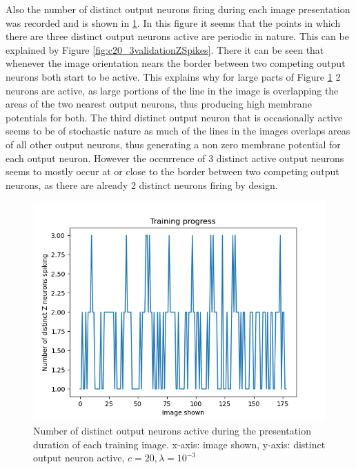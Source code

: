 Also the number of distinct output neurons firing during each image presentation was recorded and is shown in \ref{fig:c20_3validationDistinctZSpikes}. In this figure it seems that the points in which there are three distinct output neurons active are periodic in nature. This can be explained by Figure \ref{fig:c20_3validationZSpikes}. There it can be seen that whenever the image orientation nears the border between two competing output neurons both start to be active. This explains why for large parts of Figure \ref{fig:c20_3validationDistinctZSpikes} 2 neurons are active, as large portions of the line in the image is overlapping the areas of the two nearest output neurons, thus producing high membrane potentials for both. The third distinct output neuron that is occasionally active seems to be of stochastic nature as much of the lines in the images overlaps areas of all other output neurons, thus generating a non zero membrane potential for each output neuron. However the occurrence of 3 distinct active output neurons seems to mostly occur at or close to the border between two competing output neurons, as there are already 2 distinct neurons firing by design.

\begin{figure}
  \includegraphics[width=\linewidth]{figures/angleNetwork/c20_3validationDistinctZSpikes.png}
  \caption{Number of distinct output neurons active during the presentation duration of each training image. x-axis: image shown, y-axis: distinct output neuron active, $c = 20, \lambda = 10^{-3}$}
  \label{fig:c20_3validationDistinctZSpikes}
\end{figure}

